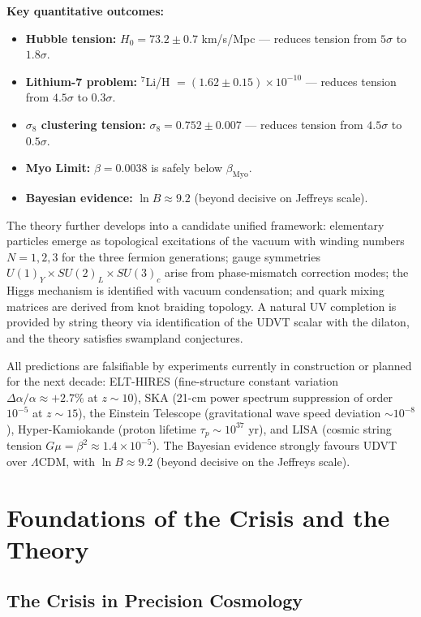 \documentclass[12pt,a4paper]{book}
\theoremstyle{definition}
\theoremstyle{remark}
\begin{document}
\textbf{Key quantitative outcomes:}
\begin{itemize}
    \item \textbf{Hubble tension:} $H_0 = 73.2 \pm 0.7$ km/s/Mpc --- reduces tension from $5\sigma$ to $1.8\sigma$.
    \item \textbf{Lithium-7 problem:} $^7$Li/H $= (1.62 \pm 0.15) \times 10^{-10}$ --- reduces tension from $4.5\sigma$ to $0.3\sigma$.
    \item \textbf{$\sigma_8$ clustering tension:} $\sigma_8 = 0.752 \pm 0.007$ --- reduces tension from $4.5\sigma$ to $0.5\sigma$.
    \item \textbf{Myo Limit:} $\beta = 0.0038$ is safely below $\beta_{\mathrm{Myo}}$.
    \item \textbf{Bayesian evidence:} $\ln B \approx 9.2$ (beyond decisive on Jeffreys scale).
\end{itemize}

The theory further develops into a candidate unified framework: elementary particles emerge as topological excitations of the vacuum with winding numbers $N = 1, 2, 3$ for the three fermion generations; gauge symmetries $U(1)_Y \times SU(2)_L \times SU(3)_c$ arise from phase-mismatch correction modes; the Higgs mechanism is identified with vacuum condensation; and quark mixing matrices are derived from knot braiding topology. A natural UV completion is provided by string theory via identification of the UDVT scalar with the dilaton, and the theory satisfies swampland conjectures.

All predictions are falsifiable by experiments currently in construction or planned for the next decade: ELT-HIRES (fine-structure constant variation $\Delta\alpha/\alpha \approx +2.7\%$ at $z \sim 10$), SKA (21-cm power spectrum suppression of order $10^{-5}$ at $z \sim 15$), the Einstein Telescope (gravitational wave speed deviation $\sim 10^{-8}$), Hyper-Kamiokande (proton lifetime $\tau_p \sim 10^{37}$ yr), and LISA (cosmic string tension $G\mu = \beta^2 \approx 1.4 \times 10^{-5}$). The Bayesian evidence strongly favours UDVT over $\Lambda$CDM, with $\ln B \approx 9.2$ (beyond decisive on the Jeffreys scale).

\mainmatter

\part{Foundations of the Crisis and the Theory}

\chapter{The Crisis in Precision Cosmology}
\label{ch:crisis}
\end{document}
